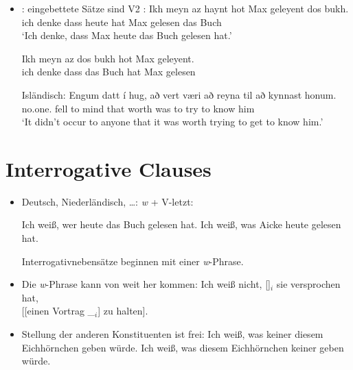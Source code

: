 \begin{itemize}
\item {}: eingebettete Sätze sind V2 \citep[]{Diesing90a}:
\eal
\ex
\gll Ikh meyn  az   haynt hot Max geleyent dos bukh.\footnotemark\\
     ich   denke dass heute hat Max gelesen   das Buch\\
\glt `Ich denke, dass Max heute das Buch gelesen hat.'

\ex%
\gll Ikh meyn  az   dos bukh hot Max geleyent.\\
     ich denke dass das Buch hat Max gelesen\\

\zl


Isländisch:
\ea 
\gll Engum         datt í hug,  að   vert  væri að reyna til     að kynnast honum.\footnotemark\\
     no.one.\DAT{} fell to mind that worth was  to try   \PREP{} to know    him\\%
{}
\glt `It didn't occur to anyone that it was worth trying to get to know him.'
\z



\end{itemize}





\section{Interrogative Clauses}



\begin{itemize}
\item Deutsch, Niederländisch, \ldots: \emph{w} + V-letzt:

\eal
\ex Ich weiß, wer heute das Buch gelesen hat.
\ex Ich weiß, was Aicke heute gelesen hat.
\zl

Interrogativnebensätze beginnen mit einer \emph{w}-Phrase.


\item Die \emph{w}-Phrase kann von weit her kommen:
\ea
Ich weiß nicht, []$_i$ sie versprochen hat,\\
{}[[einen Vortrag \_$_i$] zu halten].
\z


\item Stellung der anderen Konstituenten ist frei:
\eal
\ex Ich weiß, was keiner diesem Eichhörnchen geben würde.
\ex Ich weiß, was diesem Eichhörnchen keiner geben würde.
\zl


\end{itemize}




